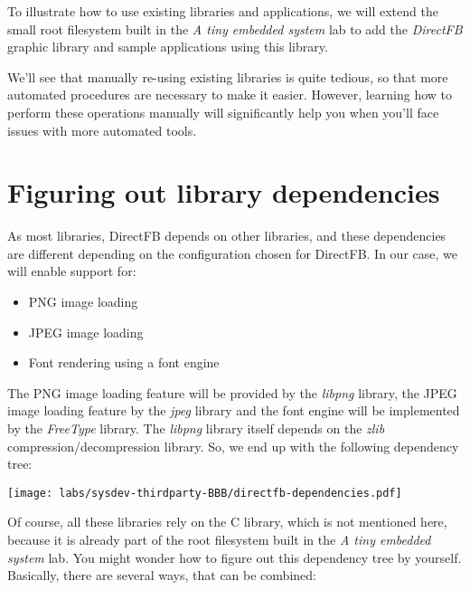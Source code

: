 
To illustrate how to use existing libraries and applications, we will
extend the small root filesystem built in the {\em A tiny embedded
  system} lab to add the {\em DirectFB} graphic library and sample
applications using this library.

We'll see that manually re-using existing libraries is quite tedious,
so that more automated procedures are necessary to make it
easier. However, learning how to perform these operations manually
will significantly help you when you'll face issues with more
automated tools.

\section{Figuring out library dependencies}

As most libraries, DirectFB depends on other libraries, and these
dependencies are different depending on the configuration chosen for
DirectFB. In our case, we will enable support for:

\begin{itemize}
\item PNG image loading
\item JPEG image loading
\item Font rendering using a font engine
\end{itemize}

The PNG image loading feature will be provided by the {\em libpng}
library, the JPEG image loading feature by the {\em jpeg} library and
the font engine will be implemented by the {\em FreeType} library. The
{\em libpng} library itself depends on the {\em zlib}
compression/decompression library. So, we end up with the following
dependency tree:

\begin{center}
\texttt{[image: labs/sysdev-thirdparty-BBB/directfb-dependencies.pdf]}
\end{center}

Of course, all these libraries rely on the C library, which is not
mentioned here, because it is already part of the root filesystem
built in the {\em A tiny embedded system} 
lab. You might wonder how to
figure out this dependency tree by yourself. Basically, there are
several ways, that can be combined:

